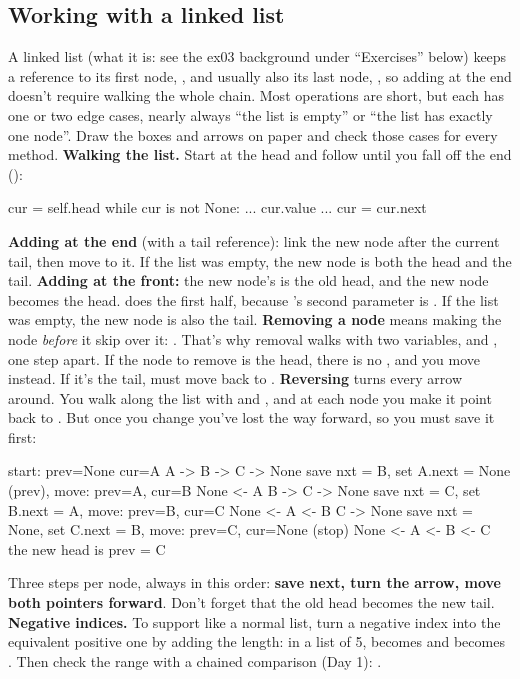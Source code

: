 \documentclass[10pt,a4paper]{article}
\begin{document}
\subsection{Working with a linked list}
A linked list (what it is: see the ex03 background under “Exercises” below) keeps a reference to its first node, , and usually also its last node, , so adding at the end doesn’t require walking the whole chain. Most operations are short, but each has one or two edge cases, nearly always “the list is empty” or “the list has exactly one node”. Draw the boxes and arrows on paper and check those cases for every method.
\textbf{Walking the list.} Start at the head and follow  until you fall off the end ():
\begin{pycode}
cur = self.head
while cur is not None:
    ... cur.value ...
    cur = cur.next
\end{pycode}
\textbf{Adding at the end} (with a tail reference): link the new node after the current tail, then move  to it. If the list was empty, the new node is both the head and the tail.
\textbf{Adding at the front:} the new node’s  is the old head, and the new node becomes the head.  does the first half, because ’s second parameter is . If the list was empty, the new node is also the tail.
\textbf{Removing a node} means making the node \emph{before} it skip over it: . That’s why removal walks with two variables,  and , one step apart. If the node to remove is the head, there is no , and you move  instead. If it’s the tail,  must move back to .
\textbf{Reversing} turns every arrow around. You walk along the list with  and , and at each node you make it point back to . But once you change  you’ve lost the way forward, so you must save it first:
\begin{txtcode}
start:   prev=None   cur=A       A -> B -> C -> None
save nxt = B,  set A.next = None (prev),  move: prev=A, cur=B
         None <- A    B -> C -> None
save nxt = C,  set B.next = A,  move: prev=B, cur=C
         None <- A <- B    C -> None
save nxt = None,  set C.next = B,  move: prev=C, cur=None   (stop)
         None <- A <- B <- C        the new head is prev = C
\end{txtcode}
Three steps per node, always in this order: \textbf{save next, turn the arrow, move both pointers forward}. Don’t forget that the old head becomes the new tail.
\textbf{Negative indices.} To support  like a normal list, turn a negative index into the equivalent positive one by adding the length: in a list of 5,  becomes  and  becomes . Then check the range with a chained comparison (Day 1): .
\end{document}

